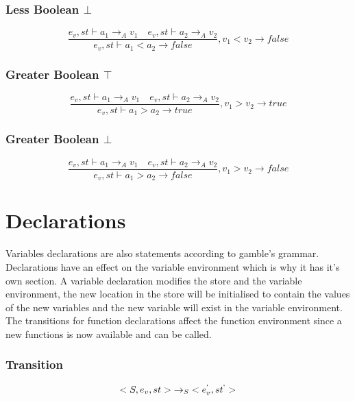 \subsubsection{Less Boolean $\bot$}
\begin{equation}
	\frac { { e }_{ v },st\vdash { a }_{ 1 }{ \rightarrow  }_{ A }{ v }_{ 1 }\quad { e }_{ v },st\vdash { a }_{ 2 }{ \rightarrow  }_{ A }{ v }_{ 2 } }{ { e }_{ v },st\vdash { a }_{ 1 }<{ a }_{ 2 }{ \rightarrow  }false } ,{ v }_{ 1 }<{ v }_{ 2 }\rightarrow false
\end{equation}

\subsubsection{Greater Boolean $\top$}
\begin{equation}
	\frac { { e }_{ v },st\vdash { a }_{ 1 }{ \rightarrow  }_{ A }{ v }_{ 1 }\quad { e }_{ v },st\vdash { a }_{ 2 }{ \rightarrow  }_{ A }{ v }_{ 2 } }{ { e }_{ v },st\vdash { a }_{ 1 }>{ a }_{ 2 }{ \rightarrow  }true } ,{ v }_{ 1 }>{ v }_{ 2 }\rightarrow true
\end{equation}

\subsubsection{Greater Boolean $\bot$}
\begin{equation}
	\frac { { e }_{ v },st\vdash { a }_{ 1 }{ \rightarrow  }_{ A }{ v }_{ 1 }\quad { e }_{ v },st\vdash { a }_{ 2 }{ \rightarrow  }_{ A }{ v }_{ 2 } }{ { e }_{ v },st\vdash { a }_{ 1 }>{ a }_{ 2 }{ \rightarrow  }false } ,{ v }_{ 1 }>{ v }_{ 2 }\rightarrow false
\end{equation}

\section*{Declarations}
Variables declarations are also statements according to \gls{gamble}'s grammar.
Declarations have an effect on the variable environment which is why it has it's own section.
A variable declaration modifies the store and the variable environment, the new location in the store will be initialised to contain the values of the new variables and the new variable will exist in the variable environment.
The transitions for function declarations affect the function environment since a new functions is now available and can be called.

\subsubsection{Transition}
\begin{equation}
<{ S },{ e }_{ v },st>{ \rightarrow  }_{ S }<{ e }_{ v }^{ ` },{ st }^{ ` }>
\end{equation}

